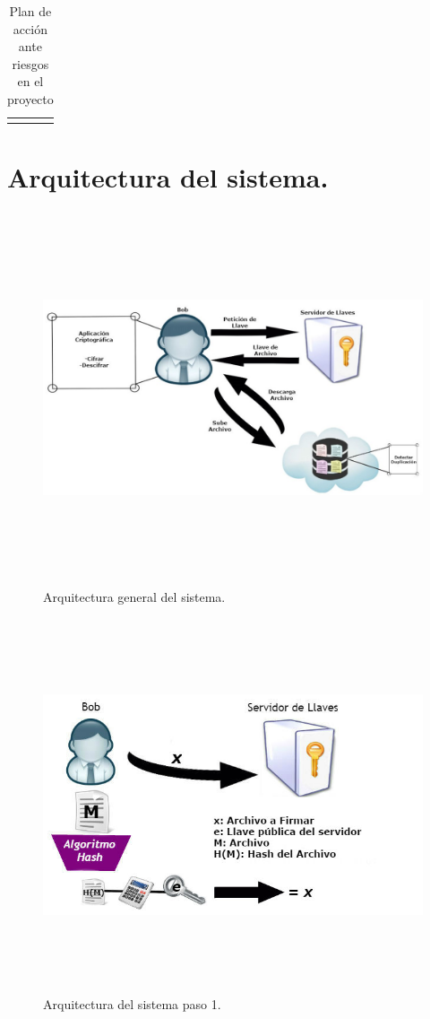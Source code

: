 \begin{longtable}{| p{1cm} | p{5cm} | p{9.5cm} |}
\\ \hline
\caption{Plan de acción ante riesgos en el proyecto}
\label{Análisis de riesgos }
\end{longtable}



\section{Arquitectura del sistema. }

\begin{figure}[H]
\centering
\includegraphics[width=18cm, height=11cm]{./images/Arqui.jpg}
\caption{Arquitectura general del sistema.}

\end{figure}

\begin{figure}[H]
\centering
\includegraphics[width=16cm, height=11cm]{./images/Paso01.jpg}
\caption{Arquitectura del sistema paso 1.}

\end{figure}

